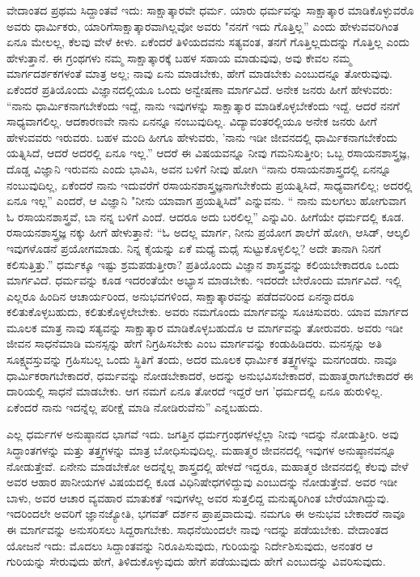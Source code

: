 ವೇದಾಂತದ ಪ್ರಥಮ ಸಿದ್ದಾಂತವೆ ಇದು: ಸಾಕ್ಷಾತ್ಕಾರವೇ ಧರ್ಮ. ಯಾರು ಧರ್ಮವನ್ನು ಸಾಕ್ಷಾತ್ಕಾರ ಮಾಡಿಕೊಳ್ಳುವರೊ ಅವರು ಧಾರ್ಮಿಕರು, ಯಾರಿಗೆ\break ಸಾಕ್ಷಾತ್ಕಾರವಾಗಿಲ್ಲವೋ ಅವರು "ನನಗೆ ಇದು ಗೊತ್ತಿಲ್ಲ” ಎಂದು ಹೇಳುವವರಿಗಿಂತ ಏನೂ ಮೇಲಲ್ಲ, ಕೆಲವು ವೇಳೆ ಕೀಳು. ಏಕೆಂದರೆ ತಿಳಿಯದವನು ಸತ್ಯವಂತ, ತನಗೆ ಗೊತ್ತಿಲ್ಲದುದನ್ನು ಗೊತ್ತಿಲ್ಲ ಎಂದು ಹೇಳುತ್ತಾನೆ. ಈ ಗ್ರಂಥಗಳು ನಮ್ಮ ಸಾಕ್ಷಾತ್ಕಾರಕ್ಕೆ ಬಹಳ ಸಹಾಯ ಮಾಡುವುವು, ಅವು ಕೇವಲ ನಮ್ಮ ಮಾರ್ಗದರ್ಶಕಗಳಂತೆ ಮಾತ್ರ ಅಲ್ಲ; ನಾವು ಏನು ಮಾಡಬೇಕು, ಹೇಗೆ ಮಾಡಬೇಕು ಎಂಬುದನ್ನೂ ತೋರುವುವು. ಏಕೆಂದರೆ ಪ್ರತಿಯೊಂದು ವಿಜ್ಞಾನದಲ್ಲಿಯೂ ಒಂದು ಅನ್ವೇಷಣಾ ಮಾರ್ಗವಿದೆ. ಅನೇಕ ಜನರು ಹೀಗೆ ಹೇಳುವರು: “ನಾನು ಧಾರ್ಮಿಕನಾಗಬೇಕೆಂದು ಇದ್ದೆ, ನಾನು ಇವುಗಳನ್ನು ಸಾಕ್ಷಾತ್ಕಾರ ಮಾಡಿಕೊಳ್ಳಬೇಕೆಂದು ಇದ್ದೆ. ಆದರೆ ನನಗೆ ಸಾಧ್ಯವಾಗಲಿಲ್ಲ. ಆದಕಾರಣವೇ ನಾನು ಏನನ್ನೂ ನಂಬುವುದಿಲ್ಲ. ವಿದ್ಯಾವಂತರಲ್ಲಿಯೂ ಅನೇಕ ಜನರು ಹೀಗೆ ಹೇಳುವವರು ಇರುವರು. ಬಹಳ ಮಂದಿ ಹೀಗೂ ಹೇಳುವರು, 'ನಾನು ಇಡೀ ಜೀವನದಲ್ಲಿ ಧಾರ್ಮಿಕನಾಗಬೇಕೆಂದು ಯತ್ನಿಸಿದೆ, ಆದರೆ ಅದರಲ್ಲಿ ಏನೂ ಇಲ್ಲ.” ಆದರೆ ಈ ವಿಷಯವನ್ನೂ ನೀವು ಗಮನಿಸುತ್ತೀರಿ; ಒಬ್ಬ ರಸಾಯನಶಾಸ್ತ್ರಜ್ಞ, ದೊಡ್ಡ ವಿಜ್ಞಾನಿ ಇರುವನು ಎಂದು ಭಾವಿಸಿ, ಅವನ ಬಳಿಗೆ ನೀವು ಹೋಗಿ “ನಾನು ರಸಾಯನಶಾಸ್ತ್ರದಲ್ಲಿ ಏನನ್ನೂ ನಂಬುವುದಿಲ್ಲ, ಏಕೆಂದರೆ ನಾನು ಇದುವರೆಗೆ ರಸಾಯನಶಾಸ್ತ್ರಜ್ಞನಾಗಬೇಕೆಂದು ಪ್ರಯತ್ನಿಸಿದೆ, ಸಾಧ್ಯವಾಗಲಿಲ್ಲ; ಅದರಲ್ಲಿ ಏನೂ ಇಲ್ಲ” ಎಂದರೆ, ಆ ವಿಜ್ಞಾನಿ "ನೀನು ಯಾವಾಗ ಪ್ರಯತ್ನಿಸಿದೆ" ಎನ್ನುವನು. “ ನಾನು ಮಲಗಲು ಹೋಗುವಾಗ ಓ ರಸಾಯನಶಾಸ್ತ್ರವೆ, ಬಾ ನನ್ನ ಬಳಿಗೆ ಎಂದೆ. ಆದರೂ ಅದು ಬರಲಿಲ್ಲ” ಎನ್ನುವಿರಿ. ಹೀಗೆಯೇ ಧರ್ಮದಲ್ಲಿ ಕೂಡ. ರಸಾಯನಶಾಸ್ತ್ರಜ್ಞ ನಕ್ಕು ಹೀಗೆ ಹೇಳುತ್ತಾನೆ: “ಓ ಅದಲ್ಲ ಮಾರ್ಗ, ನೀನು ಪ್ರಯೋಗ ಶಾಲೆಗೆ ಹೋಗಿ, ಆಸಿಡ್, ಆಲ್ಕಲಿ ಇವುಗಳೊಡನೆ ಪ್ರಯೋಗಮಾಡು. ನಿನ್ನ ಕೈಯನ್ನು ಏಕೆ ಮಧ್ಯೆ ಮಧೈ ಸುಟ್ಟುಕೊಳ್ಳಲಿಲ್ಲ? ಅದೇ ತಾನಾಗಿ ನಿನಗೆ ಕಲಿಸುತ್ತಿತ್ತು.” ಧರ್ಮಕ್ಕೂ ಇಷ್ಟು ಶ್ರಮಪಡುತ್ತೀರಾ? ಪ್ರತಿಯೊಂದು ವಿಜ್ಞಾನ ಶಾಸ್ತ್ರವನ್ನು ಕಲಿಯಬೇಕಾದರೂ ಒಂದು ಮಾರ್ಗವಿದೆ. ಧರ್ಮವನ್ನು ಕೂಡ ಇದರಂತೆಯೇ ಅಭ್ಯಾಸ ಮಾಡಬೇಕು. ಇದರದೇ ಬೇರೊಂದು ಮಾರ್ಗವಿದೆ. ಇಲ್ಲಿ ಎಲ್ಲರೂ ಹಿಂದಿನ ಆಚಾರ್ಯರಿಂದ, ಅನುಭವಗಳಿಂದ, ಸಾಕ್ಷಾತ್ಕಾರವನ್ನು ಪಡೆದವರಿಂದ ಏನನ್ನಾದರೂ ಕಲಿತುಕೊಳ್ಳಬಹುದು, ಕಲಿತುಕೊಳ್ಳಲೇಬೇಕು. ಅವರು ನಮಗೊಂದು ಮಾರ್ಗವನ್ನು ಸೂಚಿಸುವರು. ಯಾವ ಮಾರ್ಗದ ಮೂಲಕ ಮಾತ್ರ ನಾವು ಸತ್ಯವನ್ನು ಸಾಕ್ಷಾತ್ಕಾರ ಮಾಡಿಕೊಳ್ಳಬಹುದೊ ಆ ಮಾರ್ಗವನ್ನು ತೋರುವರು. ಅವರು ಇಡೀ ಜೀವನ ಸಾಧನೆಮಾಡಿ ಮನಸ್ಸನ್ನು ಹೇಗೆ ನಿಗ್ರಹಿಸಬೇಕು ಎಂಬ ಮಾರ್ಗವನ್ನು ಕಂಡುಹಿಡಿದರು. ಮನಸ್ಸನ್ನು ಅತಿ ಸೂಕ್ಷ್ಮವಸ್ತುವನ್ನು ಗ್ರಹಿಸಬಲ್ಲ ಒಂದು ಸ್ಥಿತಿಗೆ ತಂದು, ಅದರ ಮೂಲಕ ಧಾರ್ಮಿಕ ತತ್ತ್ವಗಳನ್ನು ಮನಗಂಡರು. ನಾವೂ ಧಾರ್ಮಿಕರಾಗಬೇಕಾದರೆ, ಧರ್ಮವನ್ನು ನೋಡಬೇಕಾದರೆ, ಅದನ್ನು ಅನುಭವಿಸಬೇಕಾದರೆ, ಮಹಾತ್ಮರಾಗಬೇಕಾದರೆ ಈ ದಾರಿಯಲ್ಲಿ ಸಾಧನೆ ಮಾಡಬೇಕು. ಆಗ ನಮಗೆ ಏನೂ ತೋರದೆ ಇದ್ದರೆ ಆಗ 'ಧರ್ಮದಲ್ಲಿ ಏನೂ ಹುರುಳಿಲ್ಲ. ಏಕೆಂದರೆ ನಾನು ಇದನ್ನೆಲ್ಲ ಪರೀಕ್ಷೆ ಮಾಡಿ ನೋಡಿರುವೆನು” ಎನ್ನಬಹುದು.

\newpage

ಎಲ್ಲ ಧರ್ಮಗಳ ಅನುಷ್ಠಾನದ ಭಾಗವೆ ಇದು. ಜಗತ್ತಿನ ಧರ್ಮಗ್ರಂಥಗಳಲ್ಲೆಲ್ಲಾ ನೀವು ಇದನ್ನು ನೋಡುತ್ತೀರಿ. ಅವು ಸಿದ್ಧಾಂತಗಳನ್ನು ಮತ್ತು ತತ್ತ್ವಗಳನ್ನು ಮಾತ್ರ ಬೋಧಿಸುವುದಿಲ್ಲ. ಮಹಾತ್ಮರ ಜೀವನದಲ್ಲಿ ಇವುಗಳ ಅನುಷ್ಠಾನವನ್ನೂ ನೋಡುತ್ತೇವೆ. ಏನೇನು ಮಾಡಬೇಕೋ ಅದನ್ನೆಲ್ಲ ಶಾಸ್ತ್ರದಲ್ಲಿ ಹೇಳದೆ ಇದ್ದರೂ, ಮಹಾತ್ಮರ ಜೀವನದಲ್ಲಿ ಕೆಲವು ವೇಳೆ ಅವರ ಆಹಾರ ಪಾನೀಯಗಳ ವಿಷಯದಲ್ಲಿ ಕೂಡ ವಿಧಿನಿಷೇಧಗಳಿದ್ದುವು ಎಂಬುದನ್ನು ನೋಡುತ್ತೇವೆ. ಅವರ ಇಡೀ ಬಾಳು, ಅವರ ಆಚಾರ ವ್ಯವಹಾರ ಮಾತುಕತೆ ಇವುಗಳೆಲ್ಲ ಅವರ ಸುತ್ತಲಿದ್ದ ಮನುಷ್ಯರಿಗಿಂತ ಬೇರೆಯಾಗಿದ್ದುವು. ಇದರಿಂದಲೇ ಅವರಿಗೆ ಜ್ಞಾನಜ್ಯೋತಿ, ಭಗವತ್ ದರ್ಶನ ಪ್ರಾಪ್ತವಾದುವು. ನಮಗೂ ಈ ಅನುಭವ ಬೇಕಾದರೆ ನಾವೂ ಈ ಮಾರ್ಗವನ್ನು ಅನುಸರಿಸಲು ಸಿದ್ದರಾಗಬೇಕು. ಸಾಧನೆಯಿಂದಲೇ ನಾವು ಇದನ್ನು ಪಡೆಯಬೇಕು. ವೇದಾಂತದ ಯೋಜನೆ ಇದು: ಮೊದಲು ಸಿದ್ದಾಂತವನ್ನು ನಿರೂಪಿಸುವುದು, ಗುರಿಯನ್ನು ನಿರ್ದೇಶಿಸುವುದು, ಅನಂತರ ಆ ಗುರಿಯನ್ನು ಸೇರುವುದು ಹೇಗೆ, ತಿಳಿದುಕೊಳ್ಳುವುದು ಹೇಗೆ ಪಡೆಯುವುದು ಹೇಗೆ ಎಂಬುದನ್ನು ವಿವರಿಸುವುದು.


